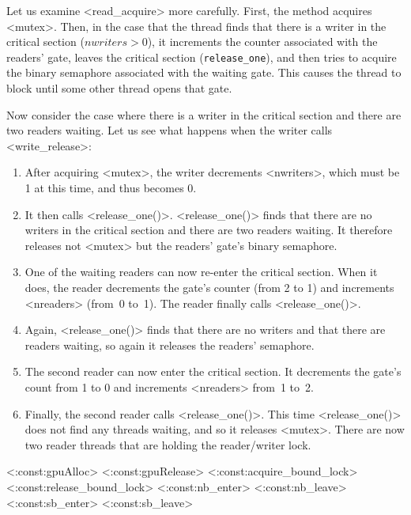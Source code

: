 \documentclass{report}
\begin{document}
Let us examine <{read_acquire}> more carefully.
First, the method acquires <{mutex}>.
Then, in the case that the thread
finds that there is a writer in the critical section
($\mathit{nwriters > 0}$), it increments the counter associated with
the readers' gate, leaves the critical section (\texttt{release\_one}), and
then tries to acquire the binary semaphore associated with the waiting gate.
This causes the thread to block until some other thread opens that gate.

Now consider the case where there is a writer in the critical
section and there are two readers waiting.  Let us see what happens when
the writer calls <{write_release}>:
\begin{enumerate}
\item After acquiring <{mutex}>, the writer decrements
<{nwriters}>, which must be 1 at this time, and thus becomes 0.
\item It then calls <{release_one()}>.
<{release_one()}> finds that there are no writers in the critical section
and there are two readers waiting.  It therefore releases not
<{mutex}> but the readers' gate's binary semaphore.
\item One of the waiting readers can now re-enter the critical section.
When it does, the reader decrements the gate's counter (from 2 to 1)
and increments <{nreaders}> (from~0 to~1).
The reader finally calls <{release_one()}>.
\item Again, <{release_one()}> finds that there are no writers and
that there are readers waiting, so again it releases the readers' semaphore.
\item The second reader can now enter the critical section.
It decrements the gate's count from 1 to 0 and increments <{nreaders}>
from~1 to~2.
\item Finally, the second reader  calls <{release_one()}>.
This time <{release_one()}> does not find any threads waiting,
and so it releases <{mutex}>.
There are now two reader threads that are holding the reader/writer lock.
\end{enumerate}

<{:const:gpuAlloc}>
<{:const:gpuRelease}>
<{:const:acquire_bound_lock}>
<{:const:release_bound_lock}>
<{:const:nb_enter}>
<{:const:nb_leave}>
<{:const:sb_enter}>
<{:const:sb_leave}>
\end{document}
